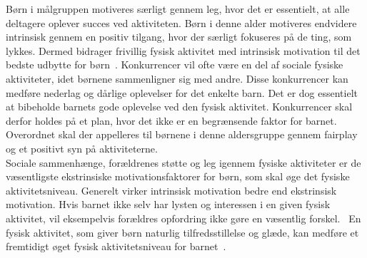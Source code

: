 Børn i målgruppen motiveres særligt gennem leg, hvor det er essentielt, at alle deltagere oplever succes ved aktiviteten. Børn i denne alder motiveres endvidere intrinsisk gennem en positiv tilgang, hvor der særligt fokuseres på de ting, som lykkes. Dermed bidrager frivillig fysisk aktivitet med intrinsisk motivation til det bedste udbytte for børn~\citep{J.Sebire2013}. Konkurrencer vil ofte være en del af sociale fysiske aktiviteter, idet børnene sammenligner sig med andre. Disse konkurrencer kan medføre nederlag og dårlige oplevelser for det enkelte barn. Det er dog essentielt at bibeholde barnets gode oplevelse ved den fysisk aktivitet. Konkurrencer skal derfor holdes på et plan, hvor det ikke er en begrænsende faktor for barnet. Overordnet skal der appelleres til børnene i denne aldersgruppe gennem fairplay og et positivt syn på aktiviteterne.~\citep{Wied2011}\\
Sociale sammenhænge, forældrenes støtte og leg igennem fysiske aktiviteter er de væsentligste ekstrinsiske motivationsfaktorer for børn, som skal øge det fysiske aktivitetsniveau. Generelt virker intrinsisk motivation bedre end ekstrinsisk motivation. Hvis barnet ikke selv har lysten og interessen i en given fysisk aktivitet, vil eksempelvis forældres opfordring ikke gøre en væsentlig forskel.~\citep{J.Sebire2013,McWhorter2003} En fysisk aktivitet, som giver børn naturlig tilfredsstillelse og glæde, kan medføre et fremtidigt øget fysisk aktivitetsniveau for barnet~\citep{Romani2013}.